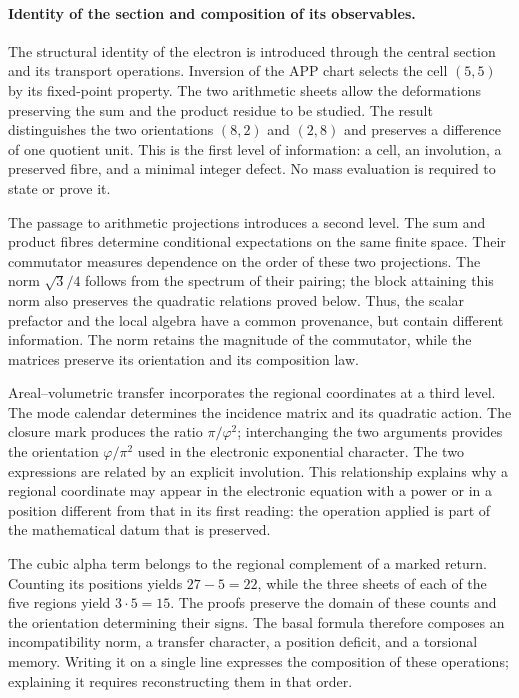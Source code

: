 \paragraph{Identity of the section and composition of its observables.}
\label{el-ampl-articulacion}
The structural identity of the electron is introduced through the central
section and its transport operations. Inversion of the APP chart
selects the cell $(5,5)$ by its fixed-point property. The two arithmetic
sheets allow the deformations preserving the sum and the product
residue to be studied. The result distinguishes the two orientations
$(8,2)$ and $(2,8)$ and preserves a difference of one quotient unit.
This is the first level of information: a cell, an involution, a
preserved fibre, and a minimal integer defect. No mass evaluation
is required to state or prove it.

The passage to arithmetic projections introduces a second level. The
sum and product fibres determine conditional expectations on the
same finite space. Their commutator measures dependence on the
order of these two projections. The norm $\sqrt3/4$ follows from the spectrum
of their pairing; the block attaining this norm also preserves
the quadratic relations proved below. Thus, the scalar
prefactor and the local algebra have a common provenance, but
contain different information. The norm retains the magnitude of the
commutator, while the matrices preserve its orientation and its
composition law.

Areal--volumetric transfer incorporates the regional coordinates
at a third level. The mode calendar determines the incidence
matrix and its quadratic action. The closure mark produces the ratio
$\pi/\varphi^2$; interchanging the two arguments provides the
orientation $\varphi/\pi^2$ used in the electronic exponential
character. The two expressions are related by an explicit
involution. This relationship explains why a regional coordinate may
appear in the electronic equation with a power or in a position
different from that in its first reading: the operation applied
is part of the mathematical datum that is preserved.

The cubic alpha term belongs to the regional complement of a marked
return. Counting its positions yields $27-5=22$, while the
three sheets of each of the five regions yield $3\cdot5=15$.
The proofs preserve the domain of these counts and the
orientation determining their signs. The basal formula therefore
composes an incompatibility norm, a transfer character,
a position deficit, and a torsional memory.
Writing it on a single line expresses the composition of these
operations; explaining it requires reconstructing them in that order.

